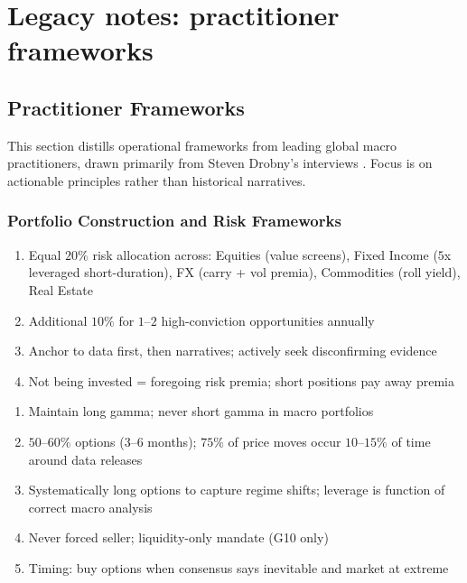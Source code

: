 \documentclass[a4paper,oneside,openany]{book}
\begin{document}
\chapter*{Legacy notes: practitioner frameworks}

\section{Practitioner Frameworks}

This section distills operational frameworks from leading global macro practitioners, drawn primarily from Steven Drobny's interviews \citep{s7-drobny}. Focus is on actionable principles rather than historical narratives.

\subsection*{Portfolio Construction and Risk Frameworks}

\begin{remark} 
\begin{enumerate}[label=\roman*.]
\setlength{\itemsep}{0pt}
\item Equal $20\%$ risk allocation across: Equities (value screens), Fixed Income ($5$x leveraged short-duration), FX (carry + vol premia), Commodities (roll yield), Real Estate
\item Additional $10\%$ for $1$--$2$ high-conviction opportunities annually
\item Anchor to data first, then narratives; actively seek disconfirming evidence
\item Not being invested = foregoing risk premia; short positions pay away premia
\end{enumerate}
\end{remark}

\begin{remark} 
\begin{enumerate}[label=\roman*.]
\setlength{\itemsep}{0pt}
\item Maintain long gamma; never short gamma in macro portfolios
\item $50$--$60\%$ options ($3$--$6$ months); $75\%$ of price moves occur $10$--$15\%$ of time around data releases
\item Systematically long options to capture regime shifts; leverage is function of correct macro analysis
\item Never forced seller; liquidity-only mandate (G10 only)
\item Timing: buy options when consensus says inevitable and market at extreme
\end{enumerate}
\end{remark}
\end{document}
